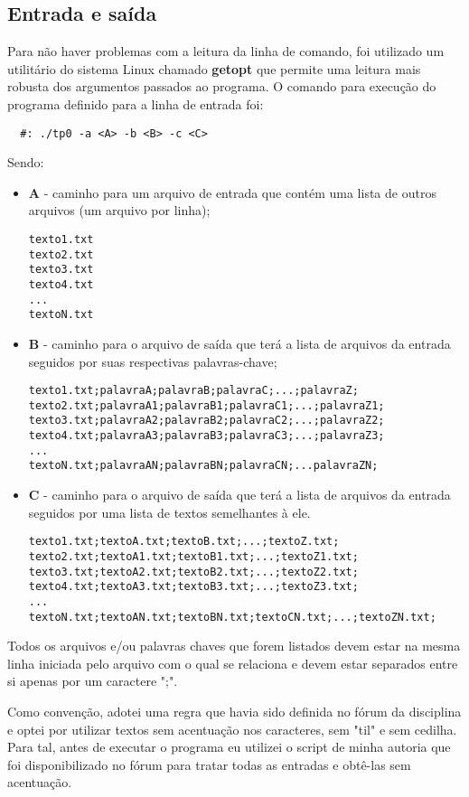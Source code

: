\documentclass[12pt]{article}
\begin{document}
\subsection{Entrada e saída}
Para não haver problemas com a leitura da linha de comando, foi utilizado um utilitário do
sistema Linux chamado \textbf{getopt} que permite uma leitura mais robusta dos argumentos
passados ao programa. O comando para execução do programa definido para a linha de entrada 
foi:
\begin{verbatim}
  #: ./tp0 -a <A> -b <B> -c <C>
\end{verbatim}
Sendo: 
\begin{itemize}
  \item \textbf{A} - caminho para um arquivo de entrada que contém uma lista de outros 
      arquivos (um arquivo por linha);
\begin{verbatim}
texto1.txt
texto2.txt
texto3.txt
texto4.txt
...
textoN.txt
\end{verbatim}
  \item \textbf{B} - caminho para o arquivo de saída que terá a lista de arquivos da 
      entrada seguidos por suas respectivas palavras-chave;
\begin{verbatim}
texto1.txt;palavraA;palavraB;palavraC;...;palavraZ;
texto2.txt;palavraA1;palavraB1;palavraC1;...;palavraZ1;
texto3.txt;palavraA2;palavraB2;palavraC2;...;palavraZ2;
texto4.txt;palavraA3;palavraB3;palavraC3;...;palavraZ3;
...
textoN.txt;palavraAN;palavraBN;palavraCN;...palavraZN;
\end{verbatim}
  \item \textbf{C} - caminho para o arquivo de saída que terá a lista de arquivos da 
      entrada seguidos por uma lista de textos semelhantes à ele.
\begin{verbatim}
texto1.txt;textoA.txt;textoB.txt;...;textoZ.txt;
texto2.txt;textoA1.txt;textoB1.txt;...;textoZ1.txt;
texto3.txt;textoA2.txt;textoB2.txt;...;textoZ2.txt;
texto4.txt;textoA3.txt;textoB3.txt;...;textoZ3.txt;
...
textoN.txt;textoAN.txt;textoBN.txt;textoCN.txt;...;textoZN.txt;
\end{verbatim}
\end{itemize}

Todos os arquivos e/ou palavras chaves que forem listados devem estar na mesma linha 
iniciada pelo arquivo com o qual se relaciona e devem estar separados entre si apenas por
um caractere ";".

Como convenção, adotei uma regra que havia sido definida no fórum da disciplina e optei 
por utilizar textos sem acentuação nos caracteres, sem "til" e sem cedilha. Para tal, 
antes de executar o programa eu utilizei o script de minha autoria que foi disponibilizado
no fórum para tratar todas as entradas e obtê-las sem acentuação.
\end{document}
